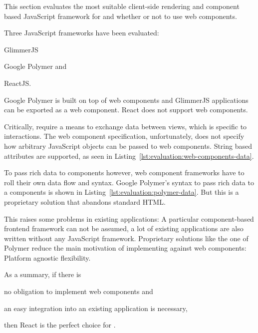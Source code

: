This section evaluates the most suitable client-side rendering and component based JavaScript framework for \cmvs{} and whether or not to use web components.

Three JavaScript frameworks have been evaluated:
\begin{enumerate*}[label=(\arabic*)]
  \item GlimmerJS
  \item Google Polymer and
  \item ReactJS.
\end{enumerate*}
Google Polymer is built on top of web components and GlimmerJS applications can be exported as a web component.
React does not support web components.

Critically, \cmvs{} require a means to exchange data between views, which is specific to interactions.
The web component specification, unfortunately, does not specify how arbitrary JavaScript objects can be passed to web components.
String based attributes are supported, as seen in Listing~\ref{lst:evaluation:web-components-data}.

To pass rich data to components however, web component frameworks have to roll their own data flow and syntax.
Google Polymer's syntax to pass rich data to a components is shown in Listing~\ref{lst:evaluation:polymer-data}.
But this is a proprietary solution that abandons standard HTML.






This raises some problems in existing applications:
A particular component-based frontend framework can not be assumed, a lot of existing applications are also written without any JavaScript framework.
Proprietary solutions like the one of Polymer reduce the main motivation of implementing against web components:
Platform agnostic flexibility.

As a summary, if there is
\begin{enumerate*}[label=(\arabic*)]
  \item no obligation to implement web components and
  \item an easy integration into an existing application is necessary,
\end{enumerate*}
then React is the perfect choice for \cmvs{}.

